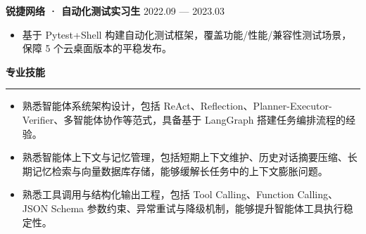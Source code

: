 \documentclass[10pt,a4paper]{ctexart}
\newcommand{\cvsection}[1]{%
  \vspace{3mm}%
  {\large\bfseries\textcolor{sec}{#1}}\par
  \vspace{-0.5mm}
  {\color{sec}\rule[2pt]{\linewidth}{0.55pt}}\vspace{-1mm}
}
\begin{document}


\textbf{\large 锐捷网络 · 自动化测试实习生 } \hfill {\large 2022.09 — 2023.03}

\begin{itemize}
    \item 基于 Pytest+Shell 构建自动化测试框架，覆盖功能/性能/兼容性测试场景，保障 5 个云桌面版本的平稳发布。
\end{itemize}


\cvsection{专业技能}
\begin{itemize}[itemsep=1pt]

\item 熟悉智能体系统架构设计，包括 ReAct、Reflection、Planner-Executor-Verifier、多智能体协作等范式，具备基于 LangGraph 搭建任务编排流程的经验。

\item 熟悉智能体上下文与记忆管理，包括短期上下文维护、历史对话摘要压缩、长期记忆检索与向量数据库存储，能够缓解长任务中的上下文膨胀问题。

\item 熟悉工具调用与结构化输出工程，包括 Tool Calling、Function Calling、JSON Schema 参数约束、异常重试与降级机制，能够提升智能体工具执行稳定性。

\end{itemize}
\end{document}
